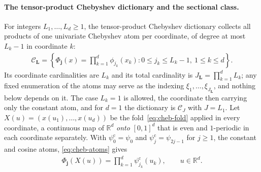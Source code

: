 \paragraph*{The tensor-product Chebyshev dictionary and the sectional class.}
For integers $L_1,\ldots,L_d\geq1$, the tensor-product Chebyshev dictionary collects all products of one univariate Chebyshev atom per coordinate, of degree at most $L_k-1$ in coordinate $k$:
\begin{align*}
\mathcal C_{\boldsymbol L}
=\left\{\Phi_{\boldsymbol j}(x)=\prod_{k=1}^d\phi_{j_k}(x_k):
0\leq j_k\leq L_k-1,\ 1\leq k\leq d\right\}.
\end{align*}
Its coordinate cardinalities are $L_k$ and its total cardinality is $J_{\boldsymbol L}=\prod_{k=1}^dL_k$; any fixed enumeration of the atoms may serve as the indexing $\xi_1,\ldots,\xi_{J_{\boldsymbol L}}$, and nothing below depends on it. The case $L_k=1$ is allowed, the coordinate then carrying only the constant atom, and for $d=1$ the dictionary is $\mathcal C_J$ with $J=L_1$. Let $X(u)=(x(u_1),\ldots,x(u_d))$ be the fold~\eqref{eq:cheb-fold} applied in every coordinate, a continuous map of $\mathbb R^d$ \emph{onto} $[0,1]^d$ that is even and $1$-periodic in each coordinate separately. With $\psi^{\mathrm c}_0=\psi_0$ and $\psi^{\mathrm c}_j=\psi_{2j-1}$ for $j\geq1$, the constant and cosine atoms, \eqref{eq:cheb-atoms} gives
\begin{align}
\Phi_{\boldsymbol j}(X(u))=\prod_{k=1}^d\psi^{\mathrm c}_{j_k}(u_k),
\qquad u\in\mathbb R^d .
\label{eq:cheb-aniso-atoms}
\end{align}

